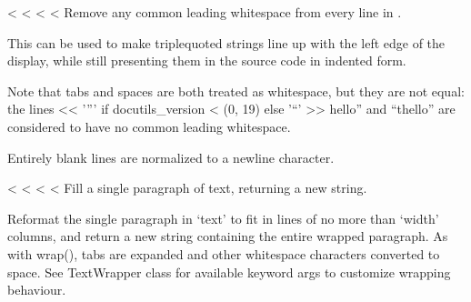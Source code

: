 \documentclass[letterpaper,10pt,english]{sphinxmanual}
\begin{document}
\begin{savenotes}
\begin{savenotes}
\begin{savenotes}
\begin{savenotes}

\begin{fulllineitems}
\label{\detokenize{index:textwrap.dedent}}
<%
\pysigstartsignatures
<%
<%
<%
Remove any common leading whitespace from every line in .

This can be used to make triple\sphinxhyphen{}quoted strings line up with the left
edge of the display, while still presenting them in the source code
in indented form.

Note that tabs and spaces are both treated as whitespace, but they
are not equal: the lines << '”' if docutils_version < (0, 19) else '“' >>  hello” and “thello” are
considered to have no common leading whitespace.

Entirely blank lines are normalized to a newline character.

\end{fulllineitems}


\begin{fulllineitems}
\label{\detokenize{index:textwrap.fill}}
<%
\pysigstartsignatures
<%
<%
<%
Fill a single paragraph of text, returning a new string.

Reformat the single paragraph in ‘text’ to fit in lines of no more
than ‘width’ columns, and return a new string containing the entire
wrapped paragraph.  As with wrap(), tabs are expanded and other
whitespace characters converted to space.  See TextWrapper class for
available keyword args to customize wrapping behaviour.

\end{fulllineitems}


\end{savenotes}
\end{savenotes}
\end{savenotes}
\end{savenotes}
\end{document}
